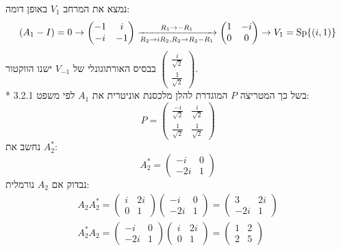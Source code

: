 נמצא את המרחב $V_1$ באופן דומה:
\[
	(A_1 - I) = 0
	\rightarrow
	\begin{pmatrix}
		-1 & i \\
		-i & -1
	\end{pmatrix}
	\xrightarrow[R_2 \to i R_2, R_2 \to R_2 - R_1]{R_1 \to -R_1}
	\begin{pmatrix}
		1 & -i \\
		0 & 0
	\end{pmatrix}
	\rightarrow
	V_1 = \operatorname{Sp}\{ (i, 1) \}
\]
בבסיס האורתוגונלי של $V_{-1}$ ישנו הווקטור $\begin{pmatrix} \frac{i}{\sqrt{2}} \\ \frac{1}{\sqrt{2}} \end{pmatrix}$. \\*
בשל כך המטריצה $P$ המוגדרת להלן מלכסנת אוניטרית את $A_1$ לפי משפט 3.2.1:
\[
	P = \begin{pmatrix}
		\frac{-i}{\sqrt{2}} & \frac{i}{\sqrt{2}} \\
		\frac{1}{\sqrt{2}} & \frac{1}{\sqrt{2}}
	\end{pmatrix}
\]
נחשב את $A_2^*$:
\[
	A_2^* = \begin{pmatrix}
		-i & 0 \\
		-2i & 1
	\end{pmatrix}
\]
נבדוק אם $A_2$ נורמלית:
\begin{align*}
	A_2 A_2^* = 
	\begin{pmatrix}
		i & 2i \\
		0 & 1
	\end{pmatrix} \begin{pmatrix}
		-i & 0 \\
		-2i & 1
	\end{pmatrix}
	= \begin{pmatrix}
		3 & 2i \\
		-2i & 1
	\end{pmatrix} \\
	A_2^* A_2 = 
	\begin{pmatrix}
		-i & 0 \\
		-2i & 1
	\end{pmatrix}
	\begin{pmatrix}
		i & 2i \\
		0 & 1
	\end{pmatrix}
	= \begin{pmatrix}
		1 & 2 \\
		2 & 5
	\end{pmatrix} \\
\end{align*}
